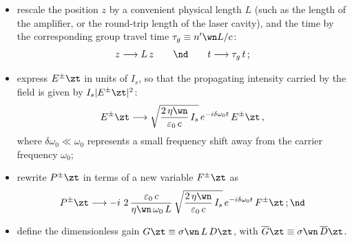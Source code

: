  \begin{itemize}
   \item rescale the position $z$ by a convenient physical length $L$ (such as the length of the amplifier, or the round-trip length of the laser cavity), and the time by the corresponding group travel time $\tau_g \equiv n^\prime\wn L/c$:
   \begin{equation*}
   z \longrightarrow L\, z \qquad \nd \qquad t \longrightarrow \tau_g\, t\, ;
   \end{equation*}
   \item express $E^\pm\zt$ in units of $I_s$, so that the propagating intensity carried by the field is given by $I_s |E^\pm\zt|^2$:
   \begin{equation*}
   E^\pm\zt \longrightarrow \sqrt{\frac{2\, \eta\wn}{\varepsilon_0\, c}\, I_s}\, e^{-i \delta \omega_0 t}\, E^\pm\zt\, ,
   \end{equation*}
   where $\delta \omega_0 \ll \omega_0$ represents a small frequency shift away from the carrier frequency $\omega_0$;
   \item rewrite $P^\pm\zt$ in terms of a new variable $F^\pm\zt$ as
   \begin{equation*}
   P^\pm\zt \longrightarrow -i\ 2\, \frac{\varepsilon_0\, c}{\eta\wn\, \omega_0\, L}\, \sqrt{\frac{2\, \eta\wn}{\varepsilon_0\, c}\, I_s}\, e^{-i \delta \omega_0 t}\, F^\pm\zt\, ; \nd
   \end{equation*}
   \item define the dimensionless gain $G\zt \equiv \sigma\wn\, L\, D\zt$, with $\overline{G}\zt \equiv \sigma\wn\,  \overline{D}\zt$.
 \end{itemize}

